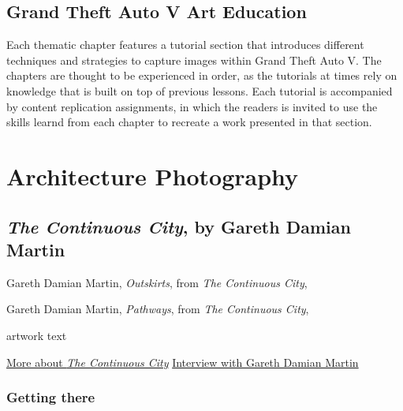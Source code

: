 \documentclass[
  openany]{book}
\begin{document}
\hypertarget{grand-theft-auto-v-art-education}{%
\section{Grand Theft Auto V Art Education}\label{grand-theft-auto-v-art-education}}

Each thematic chapter features a tutorial section that introduces different techniques and strategies to capture images within Grand Theft Auto V. The chapters are thought to be experienced in order, as the tutorials at times rely on knowledge that is built on top of previous lessons. Each tutorial is accompanied by content replication assignments, in which the readers is invited to use the skills learnd from each chapter to recreate a work presented in that section.

\hypertarget{architecture-photography}{%
\chapter{Architecture Photography}\label{architecture-photography}}

\hypertarget{the-continuous-city-by-gareth-damian-martin}{%
\section*{\texorpdfstring{\emph{The Continuous City}, by Gareth Damian Martin}{The Continuous City, by Gareth Damian Martin}}\label{the-continuous-city-by-gareth-damian-martin}}

Gareth Damian Martin, \emph{Outskirts}, from \emph{The Continuous City},

Gareth Damian Martin, \emph{Pathways}, from \emph{The Continuous City},

artwork text

\href{https://socks-studio.com/2019/10/13/gareth-damian-martin-postcards-from-the-continuous-city-2018/}{More about \emph{The Continuous City}}
\href{https://www.gamescenes.org/2018/04/interview-gareth-damian-martin-the-aesthetics-of-analogue-game-photography.html}{Interview with Gareth Damian Martin}

\hypertarget{getting-there}{%
\subsection*{Getting there}\label{getting-there}}
\end{document}
